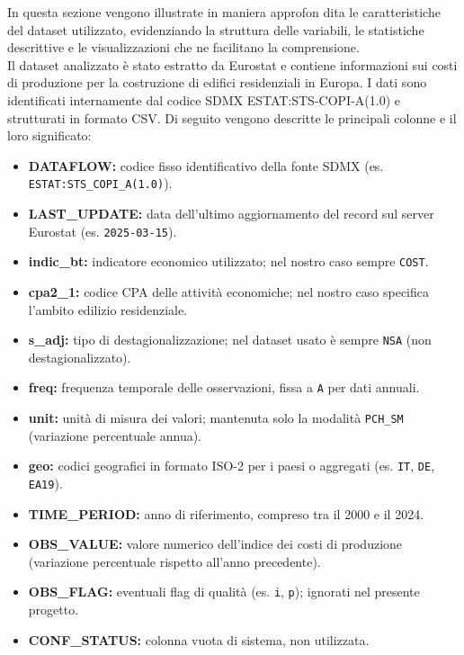 \documentclass[conference]{IEEEtran}
\begin{document}
     In questa sezione vengono illustrate in maniera approfon
dita le caratteristiche del dataset utilizzato, evidenziando la
 struttura delle variabili, le statistiche descrittive e le visualizzazioni che ne facilitano la comprensione.\\
Il dataset analizzato è stato estratto da Eurostat e contiene informazioni sui costi di produzione per la costruzione di edifici residenziali in Europa. I dati sono identificati internamente dal codice SDMX ESTAT:STS-COPI-A(1.0) e strutturati in formato CSV. Di seguito vengono descritte le principali colonne e il loro significato:

\begin{itemize} 
\item \textbf{DATAFLOW:} codice fisso identificativo della fonte SDMX (es. \texttt{ESTAT:STS\_COPI\_A(1.0)}). 
\item \textbf{LAST\_UPDATE:} data dell’ultimo aggiornamento del record sul server Eurostat (es. \texttt{2025-03-15}). 
\item \textbf{indic\_bt:} indicatore economico utilizzato; nel nostro caso sempre \texttt{COST}. 
\item \textbf{cpa2\_1:} codice CPA delle attività economiche; nel nostro caso specifica l’ambito edilizio residenziale. 
\item \textbf{s\_adj:} tipo di destagionalizzazione; nel dataset usato è sempre \texttt{NSA} (non destagionalizzato). 
\item \textbf{freq:} frequenza temporale delle osservazioni, fissa a \texttt{A} per dati annuali. 
\item \textbf{unit:} unità di misura dei valori; mantenuta solo la modalità \texttt{PCH\_SM} (variazione percentuale annua). 
\item \textbf{geo:} codici geografici in formato ISO-2 per i paesi o aggregati (es. \texttt{IT}, \texttt{DE}, \texttt{EA19}). 
\item \textbf{TIME\_PERIOD:} anno di riferimento, compreso tra il 2000 e il 2024. 
\item \textbf{OBS\_VALUE:} valore numerico dell’indice dei costi di produzione (variazione percentuale rispetto all’anno precedente). 
\item \textbf{OBS\_FLAG:} eventuali flag di qualità (es. \texttt{i}, \texttt{p}); ignorati nel presente progetto. 
\item \textbf{CONF\_STATUS:} colonna vuota di sistema, non utilizzata. \end{itemize}
\end{document}
